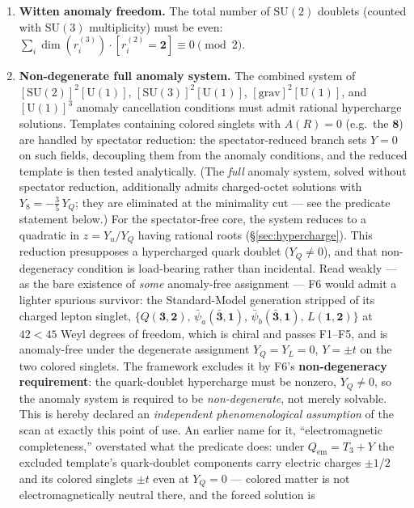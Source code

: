 \documentclass[11pt]{article}
\theoremstyle{definition}
\newcommand{\SU}{\mathrm{SU}}
\newcommand{\U}{\mathrm{U}}
\begin{document}
\begin{enumerate}[label=\textbf{F\arabic*},nosep,leftmargin=3em]
  \item \textbf{Witten anomaly freedom.}\quad
  The total number of $\SU(2)$ doublets (counted with $\SU(3)$ multiplicity)
  must be even: $\sum_i \dim(r_i^{(3)}) \cdot [r_i^{(2)} = \mathbf{2}]
  \equiv 0 \pmod{2}$.

  \item \textbf{Non-degenerate full anomaly system.}\quad
  The combined system of $[\SU(2)]^2[\U(1)]$, $[\SU(3)]^2[\U(1)]$,
  $[\mathrm{grav}]^2[\U(1)]$, and $[\U(1)]^3$ anomaly cancellation
  conditions must admit rational hypercharge solutions.  Templates
  containing colored singlets with $A(R) = 0$ (e.g.\ the $\mathbf{8}$)
  are handled by spectator reduction: the spectator-reduced branch
  sets $Y = 0$ on such fields, decoupling them from the anomaly
  conditions, and the reduced template is then tested analytically.
  (The \emph{full} anomaly system, solved without spectator reduction,
  additionally admits charged-octet solutions with
  $Y_8 = -\tfrac{3}{5}\,Y_Q$; they are eliminated at the minimality
  cut --- see the predicate statement below.)  For the spectator-free core, the system reduces
  to a quadratic in $z = Y_u/Y_Q$ having rational roots
  (\S\ref{sec:hypercharge}).  This reduction presupposes a hypercharged
  quark doublet ($Y_Q \neq 0$), and that non-degeneracy condition is
  load-bearing rather than incidental.  Read weakly --- as the bare
  existence of \emph{some} anomaly-free assignment --- F6 would admit a
  lighter spurious survivor: the Standard-Model generation stripped of its
  charged lepton singlet, $\{Q(\mathbf{3},\mathbf{2}),\,
  \bar\psi_a(\bar{\mathbf{3}},\mathbf{1}),\,
  \bar\psi_b(\bar{\mathbf{3}},\mathbf{1}),\, L(\mathbf{1},\mathbf{2})\}$
  at $42 < 45$ Weyl degrees of freedom, which is chiral and passes
  F1--F5, and is anomaly-free under the degenerate assignment
  $Y_Q = Y_L = 0$, $Y = \pm t$ on the two colored singlets.  The framework
  excludes it by F6's \textbf{non-degeneracy requirement}: the
  quark-doublet hypercharge must be nonzero, $Y_Q \neq 0$, so the
  anomaly system is required to be \emph{non-degenerate}, not merely
  solvable.  This is hereby declared an \emph{independent
  phenomenological assumption} of the scan at exactly this point of
  use.  An earlier name for it, ``electromagnetic completeness,''
  overstated what the predicate does: under
  $Q_{\mathrm{em}} = T_3 + Y$ the excluded template's quark-doublet
  components carry electric charges $\pm 1/2$ and its colored
  singlets $\pm t$ even at $Y_Q = 0$ --- colored matter is not
  electromagnetically neutral there, and the forced solution is

\end{enumerate}
\end{document}
